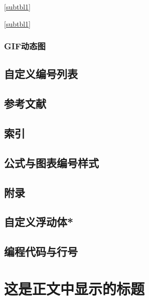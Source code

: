 \documentclass{ctexart}
\begin{document}
            \thesubtable\par
            \ref{subtbl1}\par
            \autoref{subtbl1}
            
        \subsubsection{GIF动态图}
    \subsection{自定义编号列表}
            
    \subsection{参考文献}
    \subsection{索引}
    \subsection{公式与图表编号样式}
    \subsection{附录}
    \subsection{自定义浮动体*}
    \subsection{编程代码与行号}



\section[这是目录中显示的标题]{这是正文中显示的标题}
\end{document}
